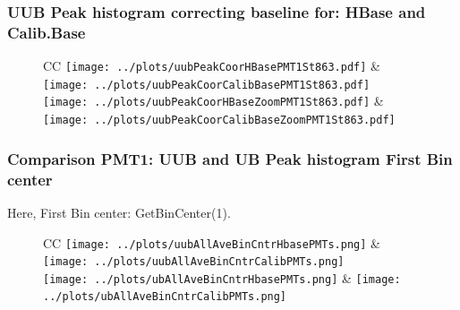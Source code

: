 \documentclass[aspectratio=169]{beamer}
\begin{document}

\begin{frame}
	\frametitle{UUB Peak histogram correcting baseline for: HBase and Calib.Base}
	\begin{figure}
		\centering
		\begin{tabularx}{\textwidth}{CC}
			\texttt{[image: ../plots/uubPeakCoorHBasePMT1St863.pdf]}
			&
			\texttt{[image: ../plots/uubPeakCoorCalibBasePMT1St863.pdf]}
			\\
			\texttt{[image: ../plots/uubPeakCoorHBaseZoomPMT1St863.pdf]}
			&
			\texttt{[image: ../plots/uubPeakCoorCalibBaseZoomPMT1St863.pdf]}
			\\
		\end{tabularx}
	\end{figure}
\end{frame}



\begin{frame}
  \frametitle{Comparison PMT1: UUB and UB Peak histogram First Bin center}
  Here, First Bin center: GetBinCenter(1).
  \begin{figure}
    \centering
    \begin{tabularx}{\textwidth}{CC}
			\texttt{[image: ../plots/uubAllAveBinCntrHbasePMTs.png]}
			&
			\texttt{[image: ../plots/uubAllAveBinCntrCalibPMTs.png]}
      \\
			\texttt{[image: ../plots/ubAllAveBinCntrHbasePMTs.png]}
			&
			\texttt{[image: ../plots/ubAllAveBinCntrCalibPMTs.png]}
		\end{tabularx}
	\end{figure}
\end{frame}




\end{document}

